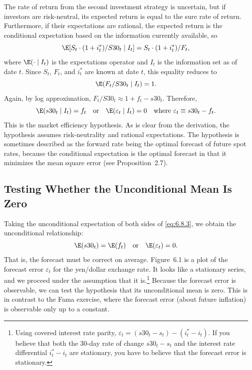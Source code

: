 The rate of return from the second investment strategy is uncertain, but if investors
are risk-neutral, its expected return is equal to the sure rate of return. Furthermore,
if their expectations are rational, the expected return is the conditional
expectation based on the information currently available, so
\begin{equation}
  \E[S_t \cdot (1 + i_t^*) / S30_t \mid I_t] = S_t \cdot (1 + i_t^*) / F_t,
  \label{eq:6.8.2}
\end{equation}
where $\E(\cdot \mid I_t)$ is the expectations operator and $I_t$ is the information set as of date
$t$. Since $S_t$, $F_t$, and $i_t^*$ are known at date $t$, this equality reduces to
\[
  \E(F_t / S30_t \mid I_t) = 1.
\]
Again, by log approximation, $F_t / S30_t \approx 1 + f_t - s30_t$. Therefore,
\begin{equation}
  \E(s30_t \mid I_t) = f_t \quad \text{or} \quad
  \E(\varepsilon_t \mid I_t) = 0 \quad \text{where } \varepsilon_t \equiv s30_t - f_t.
  \label{eq:6.8.3}
\end{equation}
This is the market efficiency hypothesis. As is clear from the derivation, the
hypothesis assumes risk-neutrality and rational expectations. The hypothesis is
sometimes described as the forward rate being the optimal forecast of future spot
rates, because the conditional expectation is the optimal forecast in that it minimizes
the mean square error (see Proposition~2.7).

\subsection*{Testing Whether the Unconditional Mean Is Zero}

Taking the unconditional expectation of both sides of \eqref{eq:6.8.3}, we obtain the unconditional
relationship:
\begin{equation}
  \E(s30_t) = \E(f_t) \quad \text{or} \quad \E(\varepsilon_t) = 0.
  \label{eq:6.8.4}
\end{equation}
That is, the forecast must be correct on average. Figure~6.1 is a plot of the forecast
error $\varepsilon_t$ for the yen/dollar exchange rate. It looks like a stationary series, and we
proceed under the assumption that it is.\footnote{Using covered interest rate parity, $\varepsilon_t = (s30_t - s_t) - (i_t^* - i_t)$. If you believe that both the 30-day rate of change $s30_t - s_t$ and the interest rate differential $i_t^* - i_t$ are stationary, you have to believe that the forecast error is stationary.}
Because the forecast error is observable,
we can test the hypothesis that its unconditional mean is zero. This is in contrast
to the Fama exercise, where the forecast error (about future inflation) is observable
only up to a constant.

